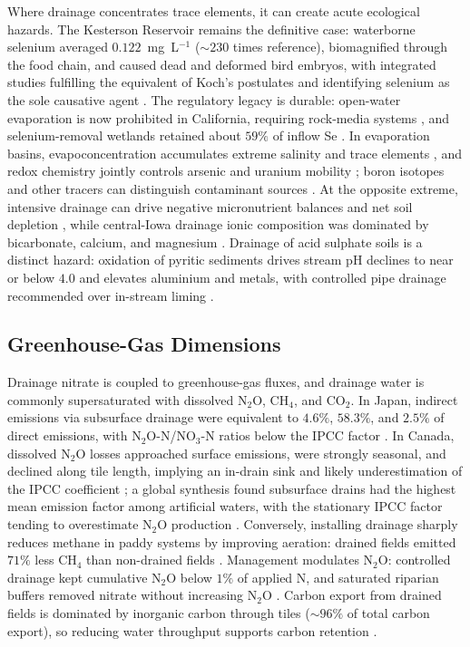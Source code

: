 Where drainage concentrates trace elements, it can create acute ecological
hazards. The Kesterson Reservoir remains the definitive case: waterborne selenium
averaged $0.122$~mg~L$^{-1}$ ($\sim230$ times reference), biomagnified through the
food chain, and caused dead and deformed bird embryos, with integrated studies
fulfilling the equivalent of Koch's postulates and identifying selenium as the
sole causative agent \parencite{SAIKI1987,Ohlendorf2002,BENSON1993}. The
regulatory legacy is durable: open-water evaporation is now prohibited in
California, requiring rock-media systems \parencite{Ayars2014,BRADFORD1991}, and
selenium-removal wetlands retained about $59\%$ of inflow Se \parencite{Gao2003}.
In evaporation basins, evapoconcentration accumulates extreme salinity and trace
elements \parencite{WESTCOT1988}, and redox chemistry jointly controls arsenic
and uranium mobility \parencite{Ryu2010,Gao2007,Duff1997}; boron isotopes and
other tracers can distinguish contaminant sources
\parencite{Tayfur2010,Komor1997,Zhou2023}. At the opposite extreme, intensive
drainage can drive negative micronutrient balances and net soil depletion
\parencite{Gul2013}, while central-Iowa drainage ionic composition was dominated
by bicarbonate, calcium, and magnesium \parencite{Zimmerman2017b}. Drainage of
acid sulphate soils is a distinct hazard: oxidation of pyritic sediments drives
stream pH declines to near or below $4.0$ and elevates aluminium and metals, with
controlled pipe drainage recommended over in-stream liming
\parencite{Osterholm2005,Åström2005,Virtanen2017,Salo2023}.

\subsection{Greenhouse-Gas Dimensions}

Drainage nitrate is coupled to greenhouse-gas fluxes, and drainage water is
commonly supersaturated with dissolved N$_2$O, CH$_4$, and CO$_2$. In Japan,
indirect emissions via subsurface drainage were equivalent to $4.6\%$, $58.3\%$,
and $2.5\%$ of direct emissions, with N$_2$O-N/NO$_3$-N ratios below the IPCC
factor \parencite{Sawamoto2003,Minamikawa2010,Minamikawa2013}. In Canada,
dissolved N$_2$O losses approached surface emissions, were strongly seasonal, and
declined along tile length, implying an in-drain sink and likely underestimation
of the IPCC coefficient \parencite{Burton2024}; a global synthesis found
subsurface drains had the highest mean emission factor among artificial waters,
with the stationary IPCC factor tending to overestimate N$_2$O production
\parencite{Webb2021}. Conversely, installing drainage sharply reduces methane in
paddy systems by improving aeration: drained fields emitted $71\%$ less CH$_4$
than non-drained fields \parencite{Shiratori2007,Furukawa2008}. Management
modulates N$_2$O: controlled drainage kept cumulative N$_2$O below $1\%$ of
applied N, and saturated riparian buffers removed nitrate without increasing
N$_2$O \parencite{Smith2019,Davis2019,Nash2015e,Carstensen2021}. Carbon export
from drained fields is dominated by inorganic carbon through tiles ($\sim96\%$ of
total carbon export), so reducing water throughput supports carbon retention
\parencite{Schilling2023,Driscoll2025}.

